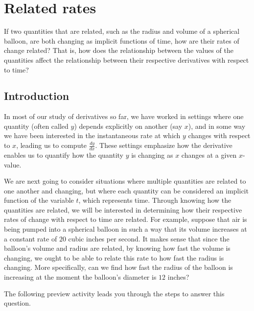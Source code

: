 \section{Related rates} \label{S:3.1.RelatedRates}

\begin{goals}
\item If two quantities that are related, such as the radius and volume of a spherical balloon, are both changing as implicit functions of time, how are their rates of change related?  That is, how does the relationship between the values of the quantities affect the relationship between their respective derivatives with respect to time?
\end{goals} 

\subsection*{Introduction}

In most of our study of derivatives so far, we have worked in settings where one quantity (often called $y$) depends explicitly on another (say $x$), and in some way we have been interested in the instantaneous rate at which $y$ changes with respect to $x$, leading us to compute $\frac{dy}{dx}$.  These settings emphasize how the derivative enables us to quantify how the quantity $y$ is changing as $x$ changes at a given $x$-value.

We are next going to consider situations where multiple quantities are related to one another and changing, but where each quantity can be considered an implicit function of the variable $t$, which represents time.  Through knowing how the quantities are related, we will be interested in determining how their respective rates of change with respect to time are related.  For example, suppose that air is being pumped into a spherical balloon in such a way that its volume increases at a constant rate of $20$ cubic inches per second.  It makes sense that since the balloon's volume and radius are related, by knowing how fast the volume is changing, we ought to be able to relate this rate to how fast the radius is changing.  More specifically, can we find how fast the radius of the balloon is increasing at the moment the balloon's diameter is $12$ inches?

The following preview activity leads you through the steps to answer this question.

